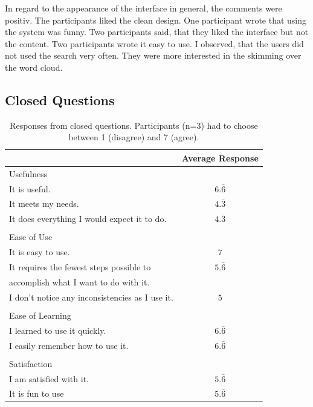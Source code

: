 \documentclass[11pt]{report}
\begin{document}
In regard to the appearance of the interface in general, the comments were positiv. The participants liked the clean design. One participant wrote that using the system was funny. Two participants said, that they liked the interface but not the content. Two participants wrote it easy to use. I observed, that the users did not used the search very often. They were more interested in the skimming over the word cloud.

\subsection{Closed Questions}

\begin{table}[h]
\caption{Responses from closed questions. Participants (n=3) had to choose between 1 (disagree) and 7 (agree). }
\label{table:closed}
\centering

\def\arraystretch{1.2}%
\begin{tabular}{ | l | c |}
\hline
& Average Response\\
\hline
\large{Usefulness}&\\
It is useful.&$6.\bar{6}$\\
It meets my needs.&$4.\bar{3}$\\
It does everything I would expect it to do.&$4.\bar{3}$\\
&\\
\large{Ease of Use}&\\
It is easy to use.&$7$\\
It requires the fewest steps possible to&$5.\bar{6}$\\
accomplish what I want to do with it.&\\
I don't notice any inconsistencies as I use it.&$5$\\
&\\
\large{Ease of Learning}&\\
I learned to use it quickly.&$6.\bar{6}$\\
I easily remember how to use it.&$6.\bar{6}$\\
&\\
\large{Satisfaction}&\\
I am satisfied with it.&$5.\bar{6}$\\
It is fun to use&$5.\bar{6}$\\

\hline

\end{tabular}
\end{table}
\end{document}
